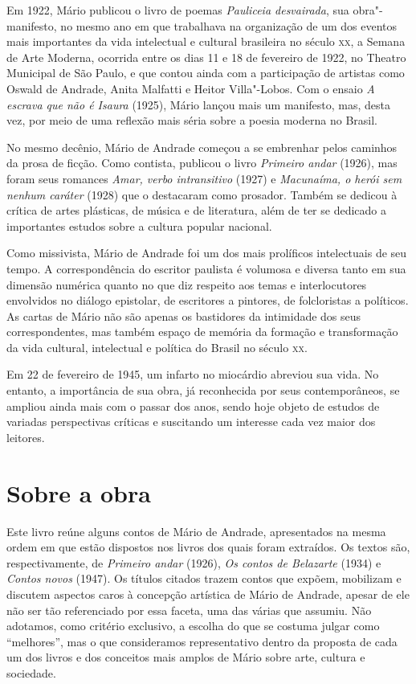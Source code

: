 Em 1922, Mário publicou o livro de poemas \emph{Pauliceia desvairada},
sua obra"-manifesto, no mesmo ano em que trabalhava na organização de um
dos eventos mais importantes da vida intelectual e cultural brasileira
no século \textsc{xx}, a Semana de Arte Moderna, ocorrida entre os dias 11 e 18
de fevereiro de 1922, no Theatro Municipal de São Paulo, e que contou
ainda com a participação de artistas como Oswald de Andrade, Anita
Malfatti e Heitor Villa"-Lobos. Com o ensaio \emph{A escrava que não é
Isaura} (1925), Mário lançou mais um manifesto, mas, desta vez, por meio
de uma reflexão mais séria sobre a poesia moderna no Brasil.

No mesmo decênio, Mário de Andrade começou a se embrenhar pelos caminhos
da prosa de ficção. Como contista, publicou o livro \emph{Primeiro
andar} (1926), mas foram seus romances \emph{Amar, verbo intransitivo}
(1927) e \emph{Macunaíma, o herói sem nenhum caráter} (1928) que o
destacaram como prosador. Também se dedicou à crítica de artes
plásticas, de música e de literatura, além de ter se dedicado a
importantes estudos sobre a cultura popular nacional.

Como missivista, Mário de Andrade foi um dos mais prolíficos
intelectuais de seu tempo. A correspondência do escritor paulista é
volumosa e diversa tanto em sua dimensão numérica quanto no que diz
respeito aos temas e interlocutores envolvidos no diálogo epistolar, de
escritores a pintores, de folcloristas a políticos. As cartas de Mário
não são apenas os bastidores da intimidade dos seus correspondentes, mas
também espaço de memória da formação e transformação da vida cultural,
intelectual e política do Brasil no século \textsc{xx}.

Em 22 de fevereiro de 1945, um infarto no miocárdio abreviou sua vida.
No entanto, a importância de sua obra, já reconhecida por seus
contemporâneos, se ampliou ainda mais com o passar dos anos, sendo hoje
objeto de estudos de variadas perspectivas críticas e suscitando um
interesse cada vez maior dos leitores.

\section{Sobre a obra}

Este livro reúne alguns contos de Mário de Andrade, apresentados na
mesma ordem em que estão dispostos nos livros dos quais foram extraídos.
Os textos são, respectivamente, de \emph{Primeiro andar} (1926),
\emph{Os contos de Belazarte} (1934) e \emph{Contos novos} (1947). Os
títulos citados trazem contos que expõem, mobilizam e discutem aspectos
caros à concepção artística de Mário de Andrade, apesar de ele não ser
tão referenciado por essa faceta, uma das várias que assumiu. Não
adotamos, como critério exclusivo, a escolha do que se costuma julgar
como ``melhores'', mas o que consideramos representativo dentro da
proposta de cada um dos livros e dos conceitos mais amplos de Mário
sobre arte, cultura e sociedade.

